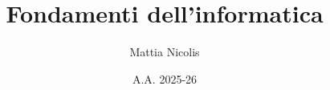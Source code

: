 \documentclass[a4paper,12pt,openright]{book}
\title{\textbf{Fondamenti dell'informatica}}
\author{Mattia Nicolis}
\date{A.A. 2025-26}
\begin{document}
    \maketitle

    \tableofcontents
    \markboth{}{}
\end{document}
